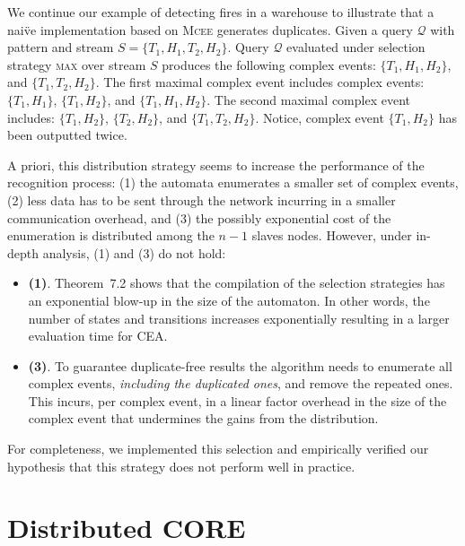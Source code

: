 \begin{example}\label{example:3}
  We continue our example of detecting fires in a warehouse to illustrate that a nai\"ve implementation based on \textsc{Mcee} generates duplicates. Given a query $\mathcal{Q}$ with pattern  and stream $S = \{ T_{1}, H_{1}, T_{2}, H_{2}\}$. Query $\mathcal{Q}$ evaluated under selection strategy \textsc{max} over stream $S$ produces the following complex events: $\{T_{1}, H_{1}, H_{2}\}$, and $\{T_{1}, T_{2}, H_{2}\}$. The first maximal complex event includes complex events: $\{T_{1}, H_{1}\}$, $\{T_{1}, H_{2}\}$, and $\{T_{1}, H_{1}, H_{2}\}$. The second maximal complex event includes: $\{T_{1}, H_{2}\}$, $\{T_{2}, H_{2}\}$, and $\{T_{1}, T_{2}, H_{2}\}$. Notice, complex event $\{T_{1}, H_{2}\}$ has been outputted twice.
\end{example}

A priori, this distribution strategy seems to increase the performance of the recognition process: (1) the automata enumerates a smaller set of complex events, (2) less data has to be sent through the network incurring in a smaller communication overhead, and (3) the possibly exponential cost of the enumeration is distributed among the $n - 1$ slaves nodes. However, under in-depth analysis, (1) and (3) do not hold:

\begin{itemize}
  \item[] \textbf{(1)}. Theorem~7.2 \cite{formal-framework-cer} shows that the compilation of the selection strategies has an exponential blow-up in the size of the automaton. In other words, the number of states and transitions increases exponentially resulting in a larger evaluation time for CEA.

  \item[] \textbf{(3)}. To guarantee duplicate-free results the algorithm needs to enumerate all complex events, \emph{including the duplicated ones}, and remove the repeated ones. This incurs, per complex event, in a linear factor overhead in the size of the complex event that undermines the gains from the distribution.
\end{itemize}

For completeness, we implemented this selection and empirically verified our hypothesis that this strategy does not perform well in practice.

\section{Distributed CORE}\label{sec:dcore}

